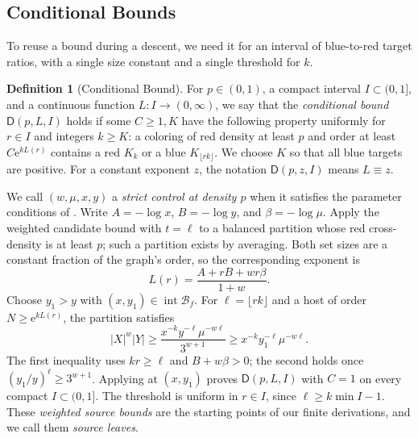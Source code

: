 \documentclass[11pt]{article}
\theoremstyle{definition}
\newtheorem{definition}[lemma]{Definition}
\newcommand{\e}{\mathrm e}
\newcommand{\BB}{\mathcal B}
\newcommand{\DD}{\mathsf D}
\begin{document}
\subsection{Conditional Bounds}
To reuse a bound during a descent, we need it for an interval of blue-to-red target ratios, with a single size constant and a single threshold for $k$.
\begin{definition}[Conditional Bound]\label{def:conditional}
For $p\in(0,1)$, a compact interval $I\subset(0,1]$, and a continuous function $L:I\to(0,\infty)$, we say that the \emph{conditional bound} $\DD(p,L,I)$ holds if some $C\ge1,K$ have the following property uniformly for $r\in I$ and integers $k\ge K$:
a coloring of red density at least $p$ and order at least $C\e^{kL(r)}$ contains a red $K_k$ or a blue $K_{\lfloor rk\rfloor}$.
We choose $K$ so that all blue targets are positive.
For a constant exponent $z$, the notation $\DD(p,z,I)$ means $L\equiv z$.
\end{definition}

We call $(w,\mu,x,y)$ a \emph{strict control at density $p$} when it satisfies the parameter conditions of .
Write $A=-\log x$, $B=-\log y$, and $\beta=-\log\mu$.
Apply the weighted candidate bound with $t=\ell$ to a balanced partition whose red cross-density is at least $p$; such a partition exists by averaging.
Both set sizes are a constant fraction of the graph's order, so the corresponding exponent is
\begin{equation}\label{eq:leaf}
 L(r)=\frac{A+rB+wr\beta}{1+w}.
\end{equation}
Choose $y_1>y$ with $(x,y_1)\in\operatorname{int}\BB_f$.
For $\ell=\lfloor rk\rfloor$ and a host of order $N\ge\e^{kL(r)}$, the partition satisfies
\[
 |X|^w|Y|\ge\frac{x^{-k}y^{-\ell}\mu^{-w\ell}}{3^{w+1}}
 \ge x^{-k}y_1^{-\ell}\mu^{-w\ell}.
\]
The first inequality uses $kr\ge\ell$ and $B+w\beta>0$; the second holds once $(y_1/y)^\ell\ge3^{w+1}$.
Applying  at $(x,y_1)$ proves $\DD(p,L,I)$ with $C=1$ on every compact $I\subset(0,1]$.
The threshold is uniform in $r\in I$, since $\ell\ge k\min I-1$.
These \emph{weighted source bounds} are the starting points of our finite derivations, and we call them \emph{source leaves}.
\end{document}

